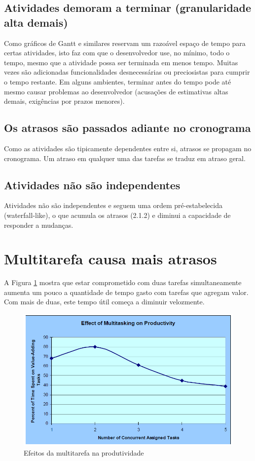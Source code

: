 \documentclass[a4paper,abntfigtabnum,noindentfirst]{abnt}
\begin{document}
\subsection{Atividades demoram a terminar (granularidade alta demais)}

Como gráficos de Gantt e similares reservam um razoável espaço de tempo para certas atividades, isto faz com que o desenvolvedor use, no mínimo, todo o tempo, mesmo que a atividade possa ser terminada em menos tempo. Muitas vezes são adicionadas funcionalidades desnecessárias ou preciosistas para cumprir o tempo restante. Em alguns ambientes, terminar antes do tempo pode até mesmo causar problemas ao desenvolvedor (acusações de estimativas altas demais, exigências por prazos menores).

\subsection{Os atrasos são passados adiante no cronograma}

Como as atividades são tipicamente dependentes entre si, atrasos se propagam no cronograma. Um atraso em qualquer uma das tarefas se traduz em atraso geral.

\subsection{Atividades não são independentes}

Atividades não são independentes e seguem uma ordem pré-estabelecida (waterfall-like), o que acumula os atrasos (2.1.2) e diminui a capacidade de responder a mudanças.


\section{Multitarefa causa mais atrasos}

A Figura \ref{efeitos-da-multitarefa} mostra que estar comprometido com duas tarefas simultaneamente aumenta um pouco a quantidade de tempo gasto com tarefas que agregam valor. Com mais de duas, este tempo útil começa a diminuir velozmente.

\begin{figure}
	\caption{Efeitos da multitarefa na produtividade}
	\label{efeitos-da-multitarefa}
	\includegraphics[scale=0.4]{efeitos-da-multitarefa}
\end{figure}
\end{document}
